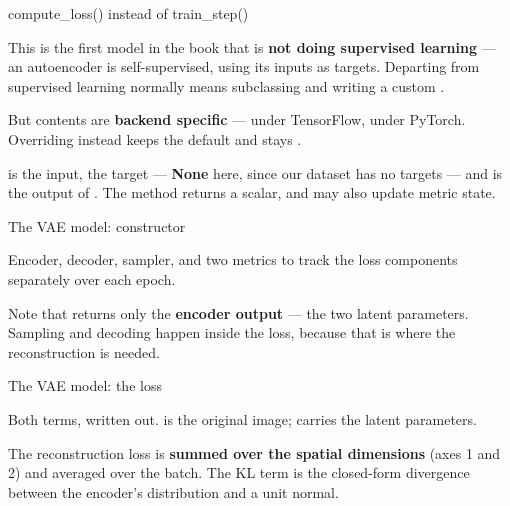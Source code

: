 \documentclass[aspectratio=169,11pt,t]{beamer}
\begin{document}
\begin{frame}[shrink=25]{compute\_loss() instead of train\_step()}
{\fontsize{9.4}{12.6}\selectfont\color{fg2}This is the first model in the book that is \textbf{not doing supervised learning} --- an autoencoder is self-supervised, using its inputs as targets. Departing from supervised learning normally means subclassing  and writing a custom .\par}\vskip 4pt
\begin{iband}[signal]
But  contents are \textbf{backend specific} ---  under TensorFlow,  under PyTorch. Overriding  instead keeps the default  and stays .
\end{iband}
{\fontsize{9.4}{12.6}\selectfont\color{fg2} is the input,  the target --- \textbf{None} here, since our dataset has no targets --- and  is the output of . The method returns a scalar, and may also update metric state.\par}\vskip 4pt
\end{frame}

\begin{frame}[shrink=25]{The VAE model: constructor}
{\fontsize{9.4}{12.6}\selectfont\color{fg2}Encoder, decoder, sampler, and two metrics to track the loss components separately over each epoch.\par}\vskip 4pt
{\fontsize{9.4}{12.6}\selectfont\color{fg2}Note that  returns only the \textbf{encoder output} --- the two latent parameters. Sampling and decoding happen inside the loss, because that is where the reconstruction is needed.\par}\vskip 4pt
\end{frame}

\begin{frame}[shrink=25]{The VAE model: the loss}
{\fontsize{9.4}{12.6}\selectfont\color{fg2}Both terms, written out.  is the original image;  carries the latent parameters.\par}\vskip 4pt
{\fontsize{9.4}{12.6}\selectfont\color{fg2}The reconstruction loss is \textbf{summed over the spatial dimensions} (axes 1 and 2) and averaged over the batch. The KL term is the closed-form divergence between the encoder's distribution and a unit normal.\par}\vskip 4pt
\end{frame}
\end{document}
